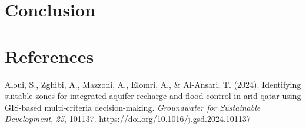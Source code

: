 \documentclass[
]{agujournal2019}
\newlength{\cslhangindent}
\newenvironment{CSLReferences}[2] %
 {\begin{list}{}{%
  \setlength{\itemindent}{0pt}
  \setlength{\leftmargin}{0pt}
  \setlength{\parsep}{0pt}
  \ifodd #1
   \setlength{\leftmargin}{\cslhangindent}
   \setlength{\itemindent}{-1\cslhangindent}
  \fi
  \setlength{\itemsep}{#2\baselineskip}}}
 {\end{list}}
\begin{document}
\section{Conclusion}\label{conclusion}

\section*{References}\label{references}

\label{refs}
\begin{CSLReferences}{1}{0}
\vspace{1em}

Aloui, S., Zghibi, A., Mazzoni, A., Elomri, A., \& Al-Ansari, T. (2024).
Identifying suitable zones for integrated aquifer recharge and flood
control in arid qatar using GIS-based multi-criteria decision-making.
\emph{Groundwater for Sustainable Development}, \emph{25}, 101137.
\url{https://doi.org/10.1016/j.gsd.2024.101137}

\end{CSLReferences}
\end{document}
